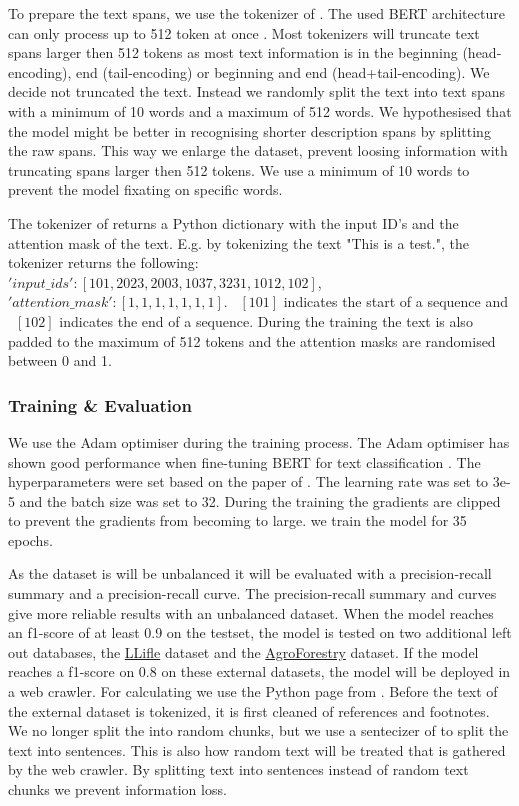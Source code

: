 \documentclass[a4paper, 12pt, oneside]{book} %
\begin{document}
To prepare the text spans, we use the tokenizer of \textcite{wolf_huggingfaces_2020}.
The used BERT architecture can only process up to 512 token at once \autocite{sanh_distilbert_2020, devlin_bert_2019}.
Most tokenizers will truncate text spans larger then 512 tokens as most text information is in the beginning (head-encoding), end (tail-encoding) or beginning and end (head+tail-encoding).
We decide not truncated the text.
Instead we randomly split the text into text spans with a minimum of 10 words and a maximum of 512 words.
We hypothesised that the model might be better in recognising shorter description spans by splitting the raw spans.  
This way we enlarge the dataset, prevent loosing information with truncating spans larger then 512 tokens. 
We use a minimum of 10 words to prevent the model fixating on specific words.


The tokenizer of \textcite{wolf_huggingfaces_2020} returns a Python dictionary with the input ID's and the attention mask of the text.
E.g. by tokenizing the text "This is a test.", the tokenizer returns the following:
~$'input\_ids': [101, 2023, 2003, 1037, 3231, 1012, 102]$, 
~$'attention\_mask': [1, 1, 1, 1, 1, 1, 1]$.
~$[101]$ indicates the start of a sequence and ~$[102]$ indicates the end of a sequence.
During the training the text is also padded to the maximum of 512 tokens and the attention masks are randomised between 0 and 1.

\subsubsection{Training \& Evaluation}
We use the Adam optimiser \autocite{kingma_adam_2017} during the training process.
The Adam optimiser has shown good performance when fine-tuning BERT for text classification \autocite{you_large_2020}.
The hyperparameters were set based on the paper of \textcite{sun_how_2020}.
The learning rate was set to 3e-5 and the batch size was set to 32.
During the training the gradients are clipped to prevent the gradients from becoming to large.
we train the model for 35 epochs.

As the dataset is will be unbalanced it will be evaluated with a precision-recall summary and a precision-recall curve.
The precision-recall summary and curves give more reliable results with an unbalanced dataset.
When the model reaches an f1-score of at least 0.9 on the testset, the model is tested on two additional left out databases, the \href{http://www.llifle.com/}{LLifle} dataset and the \href{https://www.worldagroforestry.org/}{AgroForestry} dataset.
If the model reaches a f1-score on 0.8 on these external datasets, the model will be deployed in a web crawler.
For calculating we use the Python page from \textcite{pedregosa_scikit-learn_2011}.
Before the text of the external dataset is tokenized, it is first cleaned of references and footnotes.
We no longer split the into random chunks, but we use a sentecizer of \textcite{honnibal_spacy_2020} to split the text into sentences.
This is also how random text will be treated that is gathered by the web crawler.
By splitting text into sentences instead of random text chunks we prevent information loss.
\end{document}
